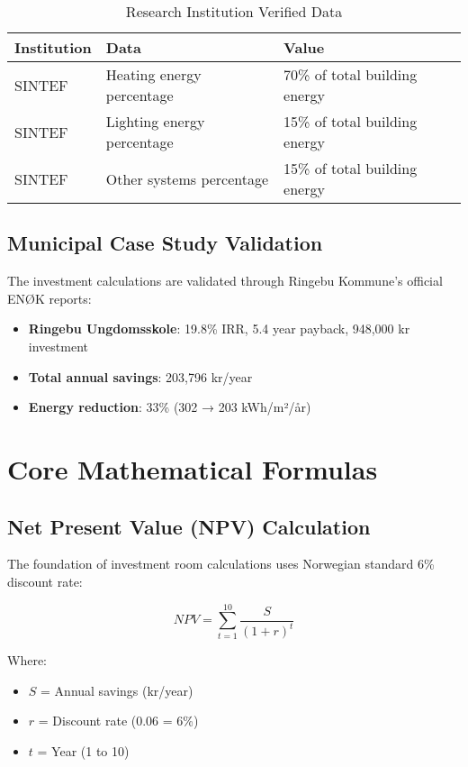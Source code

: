 \documentclass[12pt,a4paper]{article}
\begin{document}
\begin{table}[H]
\centering
\begin{tabular}{|l|l|l|}
\hline
\textbf{Institution} & \textbf{Data} & \textbf{Value} \\
\hline
SINTEF & Heating energy percentage & 70\% of total building energy \\
SINTEF & Lighting energy percentage & 15\% of total building energy \\
SINTEF & Other systems percentage & 15\% of total building energy \\
\hline
\end{tabular}
\caption{Research Institution Verified Data}
\end{table}

\subsection{Municipal Case Study Validation}

The investment calculations are validated through Ringebu Kommune's official ENØK reports:

\begin{itemize}
\item \textbf{Ringebu Ungdomsskole}: 19.8\% IRR, 5.4 year payback, 948,000 kr investment
\item \textbf{Total annual savings}: 203,796 kr/year
\item \textbf{Energy reduction}: 33\% (302 → 203 kWh/m²/år)
\end{itemize}

\section{Core Mathematical Formulas}

\subsection{Net Present Value (NPV) Calculation}

The foundation of investment room calculations uses Norwegian standard 6\% discount rate:

\begin{equation}
NPV = \sum_{t=1}^{10} \frac{S}{(1 + r)^t}
\end{equation}

Where:
\begin{itemize}
\item $S$ = Annual savings (kr/year)
\item $r$ = Discount rate (0.06 = 6\%)
\item $t$ = Year (1 to 10)
\end{itemize}
\end{document}
